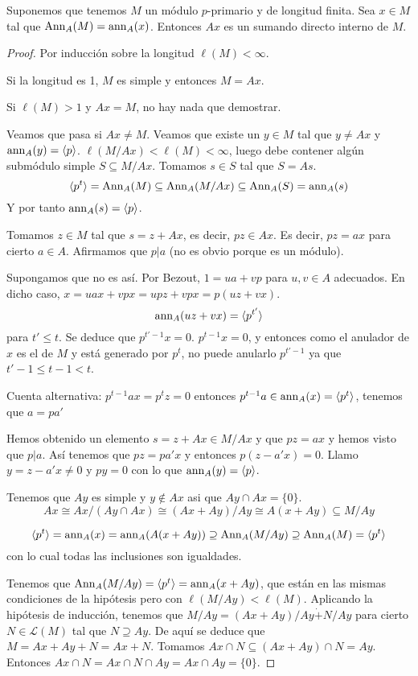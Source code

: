 \begin{prop}
  Suponemos que tenemos \(M\) un módulo \(p\)-primario y de longitud finita. Sea
  \(x\in M\) tal que \(\operatorname{Ann}_A(M)=\operatorname{ann}_A(x)\). Entonces \(Ax\) es un
  sumando directo interno de \(M\).
\end{prop}
\begin{proof}
  Por inducción sobre la longitud \(\ell(M)<\infty\).

  Si la longitud es 1, \(M\) es simple y entonces \(M=Ax\).

  Si \(\ell(M)>1\) y \(Ax=M\), no hay nada que demostrar.

  Veamos que pasa si \(Ax\neq M\). Veamos que existe un \(y \in M\)
  tal que \(y\neq Ax\) y \(\operatorname{ann}_A(y)=\langle p\rangle\).
  \(\ell(M/Ax) < \ell(M) < \infty\), luego debe contener algún
  submódulo simple \(S \subseteq M/Ax\).
  Tomamos \(s\in S\) tal que \(S=As\).
  \[
    \langle p^t\rangle =\operatorname{Ann}_A(M)\subseteq\operatorname{Ann}_A(M/Ax)\subseteq\operatorname{Ann}_A(S)
    =\operatorname{ann}_A(s)
  \]
  Y por tanto \(\operatorname{ann}_A(s)=\langle p\rangle\).

  Tomamos \(z\in M\) tal que \(s=z+Ax\), es decir, \(p z\in Ax\). Es decir,
  \(p z=ax\) para cierto \(a\in A\). Afirmamos que \(p|a\) (no es obvio
  porque es un módulo).

  Supongamos que no es así. Por Bezout, \(1=ua+vp\) para \(u,v\in A\)
  adecuados. En dicho caso, \(x=uax+vpx=upz+vpx=p(uz+vx)\).
  \[
    \operatorname{ann}_A(uz+vx)=\langle p^{t'}\rangle
  \]
  para \(t'\le t\). Se deduce que \(p^{t'-1} x=0\). \(p^{t-1}x=0\), y
  entonces como el anulador de \(x\) es el de \(M\) y está generado
  por \(p^t\), no puede anularlo \(p^{t'-1}\) ya que
  \(t'-1\le t-1<t\).

  Cuenta alternativa: \(p^{t-1}ax=p^t z=0\) entonces \(p^{t-1} a
  \in\operatorname{ann}_A(x)=\langle p^t\rangle\), tenemos que \(a=pa'\)

  Hemos obtenido un elemento \(s=z+Ax\in M/Ax\) y que \(pz=ax\) y hemos
  visto que \(p|a\). Así tenemos que \(pz=pa'x\) y entonces
  \(p(z-a'x)=0\). Llamo \(y=z-a'x\neq 0\) y \(py=0\) con lo que
  \(\operatorname{ann}_A(y)=\langle p\rangle\).

  Tenemos que \(Ay\) es simple y \(y\notin Ax\) asi que \(Ay\cap Ax=
  \{0\}\).
  \[
    Ax\cong Ax/(Ay\cap Ax)\cong (Ax+Ay)/Ay\cong A(x+Ay)\subseteq M/Ay
  \]

  \[
    \langle p^t\rangle=\operatorname{ann}_A(x)=\operatorname{ann}_A(A(x+Ay))\supseteq
    \operatorname{Ann}_A(M/Ay)\supseteq\operatorname{Ann}_A(M)=\langle p^t\rangle
  \]
  con lo cual todas las inclusiones son igualdades.

  Tenemos que \(\operatorname{Ann}_A(M/Ay)=\langle p^t\rangle=\operatorname{ann}_A(x+Ay)\), que
  están en las mismas condiciones de la hipótesis pero
  con \(\ell(M/Ay)<\ell(M)\). Aplicando la hipótesis de inducción,
  tenemos que \(M/Ay=(Ax+Ay)/Ay \dot{+} N/Ay\) para cierto
  \(N\in\mathcal{L}(M)\) tal que \(N\supseteq Ay\). De aquí se deduce
  que \(M=Ax+Ay+N=Ax+N\). Tomamos \(Ax\cap N\subseteq(Ax+Ay)\cap N=Ay\).
  Entonces \(Ax\cap N = Ax\cap N\cap Ay= Ax\cap Ay=\{0\}\).

\end{proof}
